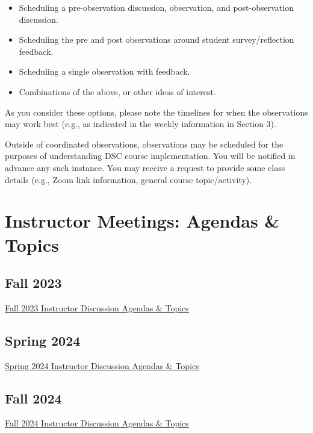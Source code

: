 \documentclass[
]{book}
\providecommand{\tightlist}{%
  \setlength{\itemsep}{0pt}\setlength{\parskip}{0pt}}
\begin{document}
\begin{itemize}
\tightlist
\item
  Scheduling a pre-observation discussion, observation, and post-observation discussion.
\item
  Scheduling the pre and post observations around student survey/reflection feedback.
\item
  Scheduling a single observation with feedback.
\item
  Combinations of the above, or other ideas of interest.
\end{itemize}

As you consider these options, please note the timelines for when the observations may work best (e.g., as indicated in the weekly information in Section 3).

Outside of coordinated observations, observations may be scheduled for the purposes of understanding DSC course implementation. You will be notified in advance any such instance. You may receive a request to provide some class details (e.g., Zoom link information, general course topic/activity).

\chapter{Instructor Meetings: Agendas \& Topics}\label{instructor-meetings-agendas-topics}

\section{Fall 2023}\label{fall-2023}

\href{https://docs.google.com/document/d/1Q_QcuQYQq2zpa6WMIYnB7TajFqMtxD8W2Eht7Zb3PRU/edit?usp=sharing}{Fall 2023 Instructor Discussion Agendas \& Topics}

\section{Spring 2024}\label{spring-2024}

\href{https://docs.google.com/document/d/1eyNGD3cgrksM8mMTiXkDDqPpbQzYD_nBHx9GlixoDVM/edit?usp=sharing}{Spring 2024 Instructor Discussion Agendas \& Topics}

\section{Fall 2024}\label{fall-2024}

\href{https://docs.google.com/document/d/1d4uNQmo_m6-1macCfkGdmlWP_1Z1T8CoJOpRosap17w/edit?usp=sharing}{Fall 2024 Instructor Discussion Agendas \& Topics}

  
\end{document}
